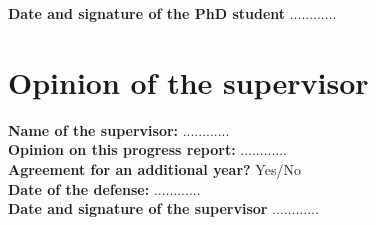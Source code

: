 \documentclass[11pt]{article}
\begin{document}
\bigskip
\bigskip
\noindent\textbf{Date and signature of the PhD student}
............

\newpage

\section*{Opinion of the supervisor}

\noindent\textbf{Name of the supervisor:}
............
\\

\noindent\textbf{Opinion on this progress report:}
............
\\

\noindent\textbf{Agreement for an additional year?}
Yes/No
\\

\noindent\textbf{Date of the defense:}
............
\\

\bigskip
\bigskip
\noindent\textbf{Date and signature of the supervisor}
............
\end{document}
